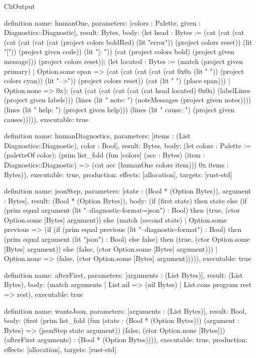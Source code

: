 \begin{lexlean}{CliOutput}
\begin{semanticmodule}
definition{
  name: humanOne,
  parameters: [colors : Palette, given : Diagnostics::Diagnostic],
  result: Bytes,
  body: (let head : Bytes := (cat (cat (cat (cat (cat (cat (cat (project colors boldRed) (lit "error")) (project colors reset)) (lit "[")) (project given code)) (lit "]: ")) (cat (project colors bold) (project given message))) (project colors reset)); (let located : Bytes := (match (project given primary)
    | Option.some span => (cat (cat (cat (cat (cat 0x0a (lit "  ")) (project colors cyan)) (lit "-->")) (project colors reset)) (cat (lit " ") (place span)))
    | Option.none => 0x); (cat (cat (cat (cat (cat (cat head located) 0x0a) (labelLines (project given labels))) (lines (lit "  note: ") (noteMessages (project given notes)))) (lines (lit "  help: ") (project given help))) (lines (lit "  cause: ") (project given causes))))),
  executable: true
}

definition{
  name: humanDiagnostics,
  parameters: [items : (List Diagnostics::Diagnostic), color : Bool],
  result: Bytes,
  body: (let colors : Palette := (paletteOf color); (prim list_fold (fun [colors] (acc : Bytes) (item : Diagnostics::Diagnostic) => (cat acc (humanOne colors item))) 0x items : Bytes)),
  executable: true,
  production: {effects: [allocation], targets: [rust-std]}
}

definition{
  name: jsonStep,
  parameters: [state : (Bool * (Option Bytes)), argument : Bytes],
  result: (Bool * (Option Bytes)),
  body: (if (first state) then state else (if (prim equal argument (lit "--diagnostic-format=json") : Bool) then (true, (ctor Option.some [Bytes] argument)) else (match (second state)
    | Option.some previous => (if (if (prim equal previous (lit "--diagnostic-format") : Bool) then (prim equal argument (lit "json") : Bool) else false) then (true, (ctor Option.some [Bytes] argument)) else (false, (ctor Option.some [Bytes] argument)))
    | Option.none => (false, (ctor Option.some [Bytes] argument))))),
  executable: true
}

definition{
  name: afterFirst,
  parameters: [arguments : (List Bytes)],
  result: (List Bytes),
  body: (match arguments | List.nil => (nil Bytes) | List.cons program rest => rest),
  executable: true
}

definition{
  name: wantsJson,
  parameters: [arguments : (List Bytes)],
  result: Bool,
  body: (first (prim list_fold (fun (state : (Bool * (Option Bytes))) (argument : Bytes) => (jsonStep state argument)) (false, (ctor Option.none [Bytes])) (afterFirst arguments) : (Bool * (Option Bytes)))),
  executable: true,
  production: {effects: [allocation], targets: [rust-std]}
}


\end{semanticmodule}
\end{lexlean}
